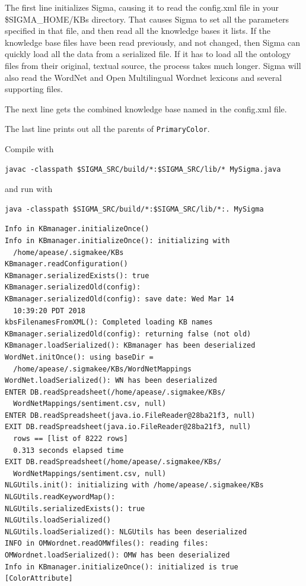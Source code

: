 \documentclass{book}
\begin{document}
The first line initializes Sigma, causing it to read the config.xml file in
your \$SIGMA\_HOME/KBs directory.  That causes Sigma to set all the parameters
specified in that file, and then read all the knowledge bases it lists.  If
the knowledge base files have been read previously, and not changed, then Sigma
can quickly load all the data from a serialized file.  If it has to load all the
ontology files from their original, textual source, the process takes much longer.
Sigma will also read the WordNet and Open Multilingual Wordnet lexicons and several
supporting files.

The next line gets the combined knowledge base named in the config.xml file.

The last line prints out all the parents of \texttt{PrimaryColor}.

Compile with

\begin{lstlisting}[basicstyle=\ttfamily\small\bfseries]
javac -classpath $SIGMA_SRC/build/*:$SIGMA_SRC/lib/* MySigma.java
\end{lstlisting}

and run with

\begin{lstlisting}[basicstyle=\ttfamily\small\bfseries]
java -classpath $SIGMA_SRC/build/*:$SIGMA_SRC/lib/*:. MySigma
\end{lstlisting}

\begin{lstlisting}[basicstyle=\ttfamily\small\bfseries]
Info in KBmanager.initializeOnce()
Info in KBmanager.initializeOnce(): initializing with 
  /home/apease/.sigmakee/KBs
KBmanager.readConfiguration()
KBmanager.serializedExists(): true
KBmanager.serializedOld(config): 
KBmanager.serializedOld(config): save date: Wed Mar 14 
  10:39:20 PDT 2018
kbsFilenamesFromXML(): Completed loading KB names
KBmanager.serializedOld(config): returning false (not old)
KBmanager.loadSerialized(): KBmanager has been deserialized 
WordNet.initOnce(): using baseDir = 
  /home/apease/.sigmakee/KBs/WordNetMappings
WordNet.loadSerialized(): WN has been deserialized 
ENTER DB.readSpreadsheet(/home/apease/.sigmakee/KBs/
  WordNetMappings/sentiment.csv, null)
ENTER DB.readSpreadsheet(java.io.FileReader@28ba21f3, null)
EXIT DB.readSpreadsheet(java.io.FileReader@28ba21f3, null)
  rows == [list of 8222 rows]
  0.313 seconds elapsed time
EXIT DB.readSpreadsheet(/home/apease/.sigmakee/KBs/
  WordNetMappings/sentiment.csv, null)
NLGUtils.init(): initializing with /home/apease/.sigmakee/KBs
NLGUtils.readKeywordMap():
NLGUtils.serializedExists(): true
NLGUtils.loadSerialized()
NLGUtils.loadSerialized(): NLGUtils has been deserialized 
INFO in OMWordnet.readOMWfiles(): reading files: 
OMWordnet.loadSerialized(): OMW has been deserialized 
Info in KBmanager.initializeOnce(): initialized is true
[ColorAttribute]
\end{lstlisting}
\end{document}
